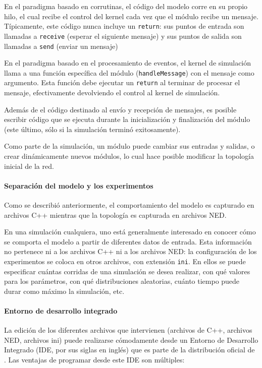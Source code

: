 En el paradigma basado en corrutinas, el código del modelo corre en su propio
hilo, el cual recibe el control del kernel cada vez que el módulo recibe un
mensaje. Típicamente, este código nunca incluye un \verb!return!: sus puntos de
entrada son llamadas a \verb!receive! (esperar el siguiente mensaje) y sus
puntos de salida son llamadas a \verb!send! (enviar un mensaje)

En el paradigma basado en el procesamiento de eventos, el kernel de simulación
llama a una función específica del módulo (\verb!handleMessage!) con el mensaje
como argumento. Esta función debe ejecutar un \verb!return! al terminar de
procesar el mensaje, efectivamente devolviendo el control al kernel de
simulación.

Además de el código destinado al envío y recepción de mensajes, es posible
escribir código que se ejecuta durante la inicialización y finalización del
módulo (este último, sólo si la simulación terminó exitosamente).

Como parte de la simulación, un módulo puede cambiar sus entradas y salidas, o
crear dinámicamente nuevos módulos, lo cual hace posible modificar la topología
inicial de la red.

\paragraph{Separación del modelo y los experimentos}

Como se describió anteriormente, el comportamiento del modelo es capturado en
archivos C++ mientras que la topología es capturada en archivos NED.

En una simulación cualquiera, uno está generalmente interesado en conocer cómo
se comporta el modelo a partir de diferentes datos de entrada. Esta información
no pertenece ni a los archivos C++ ni a los archivos NED: la configuración de
los experimentos se coloca en otros archivos, con extensión \verb!ini!. En
ellos se puede especificar cuántas corridas de una simulación se desea
realizar, con qué valores para los parámetros, con qué distribuciones
aleatorias, cuánto tiempo puede durar como máximo la simulación, etc.

\paragraph{Entorno de desarrollo integrado}

La edición de los diferentes archivos que intervienen (archivos de C++,
archivos NED, archivos ini) puede realizarse cómodamente desde un Entorno de
Desarrollo Integrado (IDE, por sus siglas en inglés) que es parte de la
distribución oficial de \omnetpp{}. Las ventajas de programar desde este IDE son
múltiples:

